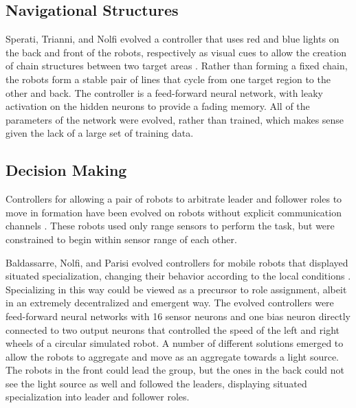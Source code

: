 \documentclass[]{article}
\begin{document}
\subsection{Navigational Structures}

Sperati, Trianni, and Nolfi evolved a controller that uses red and blue lights on the back and front of the robots, respectively as visual cues to allow the creation of chain structures between two target areas \cite{sperati2011self}.
Rather than forming a fixed chain, the robots form a stable pair of lines that cycle from one target region to the other and back. 
The controller is a feed-forward neural network, with leaky activation on the hidden neurons to provide a fading memory. 
All of the parameters of the network were evolved, rather than trained, which makes sense given the lack of a large set of training data. 

\subsection{Decision Making}

Controllers for allowing a pair of robots to arbitrate leader and follower roles to move in formation have been evolved on robots without explicit communication channels \cite{quinn2001evolving, quinn2003evolving}. 
These robots used only range sensors to perform the task, but were constrained to begin within sensor range of each other. 

Baldassarre, Nolfi, and Parisi evolved controllers for mobile robots that displayed situated specialization, changing their behavior according to the local conditions \cite{baldassarre2003evolving}.
Specializing in this way could be viewed as a precursor to role assignment, albeit in an extremely decentralized and emergent way. 
The evolved controllers were feed-forward neural networks with 16 sensor neurons and one bias neuron directly connected to two output neurons that controlled the speed of the left and right wheels of a circular simulated robot. 
A number of different solutions emerged to allow the robots to aggregate and move as an aggregate towards a light source. 
The robots in the front could lead the group, but the ones in the back could not see the light source as well and followed the leaders, displaying situated specialization into leader and follower roles. 
\end{document}
